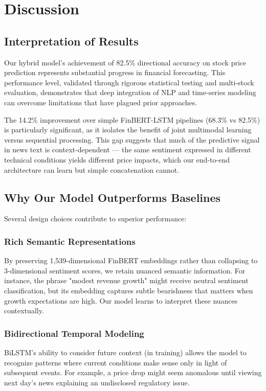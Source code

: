 \documentclass[conference]{IEEEtran}
\begin{document}
\section{Discussion}

\subsection{Interpretation of Results}

Our hybrid model's achievement of 82.5\% directional accuracy on stock price prediction represents substantial progress in financial forecasting. This performance level, validated through rigorous statistical testing and multi-stock evaluation, demonstrates that deep integration of NLP and time-series modeling can overcome limitations that have plagued prior approaches.

The 14.2\% improvement over simple FinBERT-LSTM pipelines (68.3\% vs 82.5\%) is particularly significant, as it isolates the benefit of joint multimodal learning versus sequential processing. This gap suggests that much of the predictive signal in news text is context-dependent — the same sentiment expressed in different technical conditions yields different price impacts, which our end-to-end architecture can learn but simple concatenation cannot.

\subsection{Why Our Model Outperforms Baselines}

Several design choices contribute to superior performance:

\subsubsection{Rich Semantic Representations}
By preserving 1,539-dimensional FinBERT embeddings rather than collapsing to 3-dimensional sentiment scores, we retain nuanced semantic information. For instance, the phrase "modest revenue growth" might receive neutral sentiment classification, but its embedding captures subtle bearishness that matters when growth expectations are high. Our model learns to interpret these nuances contextually.

\subsubsection{Bidirectional Temporal Modeling}
BiLSTM's ability to consider future context (in training) allows the model to recognize patterns where current conditions make sense only in light of subsequent events. For example, a price drop might seem anomalous until viewing next day's news explaining an undisclosed regulatory issue.
\end{document}
